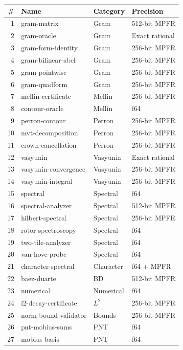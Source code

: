 \documentclass[11pt,a4paper]{article}
\begin{document}
\begin{center}
\small
\begin{tabular}{@{}rlll@{}}
\toprule
\textbf{\#} & \textbf{Name} & \textbf{Category} & \textbf{Precision} \\
\midrule
1 & gram-matrix & Gram & 512-bit MPFR \\
2 & gram-oracle & Gram & Exact rational \\
3 & gram-form-identity & Gram & 256-bit MPFR \\
4 & gram-bilinear-abel & Gram & 256-bit MPFR \\
5 & gram-pointwise & Gram & 256-bit MPFR \\
6 & gram-quadform & Gram & 256-bit MPFR \\
\midrule
7 & mellin-certificate & Mellin & 256-bit MPFR \\
8 & contour-oracle & Mellin & f64 \\
9 & perron-contour & Perron & 256-bit MPFR \\
10 & mvt-decomposition & Perron & 256-bit MPFR \\
11 & crown-cancellation & Perron & 256-bit MPFR \\
\midrule
12 & vasyunin & Vasyunin & Exact rational \\
13 & vasyunin-convergence & Vasyunin & 256-bit MPFR \\
14 & vasyunin-integral & Vasyunin & 256-bit MPFR \\
\midrule
15 & spectral & Spectral & f64 \\
16 & spectral-analyzer & Spectral & 512-bit MPFR \\
17 & hilbert-spectral & Spectral & 256-bit MPFR \\
18 & rotor-spectroscopy & Spectral & f64 \\
19 & two-tile-analyzer & Spectral & f64 \\
20 & van-hove-probe & Spectral & f64 \\
\midrule
21 & character-spectral & Character & f64 + MPFR \\
22 & baez-duarte & BD & 512-bit MPFR \\
23 & numerical & Numerical & f64 \\
24 & l2-decay-certificate & $L^2$ & 256-bit MPFR \\
25 & norm-bound-validator & Bounds & 256-bit MPFR \\
\midrule
26 & pnt-mobius-sums & PNT & f64 \\
27 & mobius-basis & PNT & f64 \\

\end{tabular}
\end{center}
\end{document}
